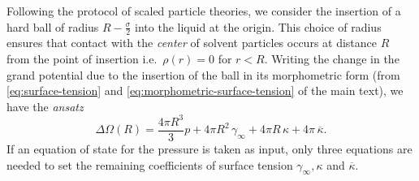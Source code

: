 \documentclass[11pt]{report}
\begin{document}
Following the protocol of scaled particle theories, we consider the insertion of a hard ball of radius $R-\frac{\sigma}{2}$ into the liquid at the origin.
This choice of radius ensures that contact with the \emph{center} of solvent particles occurs at distance $R$ from the point of insertion i.e.\ $\rho(r) = 0$ for $r < R$.
Writing the change in the grand potential due to the insertion of the ball in its morphometric form (from \eqref{eq:surface-tension} and \eqref{eq:morphometric-surface-tension} of the main text), we have the \emph{ansatz}
\begin{equation}\label{eq:morph-ball-solvation}
  \Delta \Omega(R) =
  \frac{4\pi R^3}{3} p +
  4\pi R^2 \, \gamma_\infty +
  4\pi R \, \kappa +
  4 \pi \, \overline{\kappa}.
\end{equation}
If an equation of state for the pressure is taken as input, only three equations are needed to set the remaining coefficients of surface tension $\gamma_\infty, \kappa$ and $\overline{\kappa}$.
\end{document}
